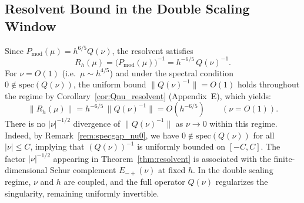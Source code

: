 \documentclass[12pt,a4paper]{amsart}
\theoremstyle{remark}
\begin{document}
\subsection{Resolvent Bound in the Double Scaling Window}
\label{subsec:resolvent_bound_ds}

Since $P_{\mathrm{mod}}(\mu) = h^{6/5}Q(\nu)$, the resolvent satisfies
\[
  R_h(\mu) = \bigl(P_{\mathrm{mod}}(\mu)\bigr)^{-1}
  = h^{-6/5}\,Q(\nu)^{-1}.
\]
For $\nu = O(1)$ (i.e.\ $\mu \sim h^{4/5}$) and under the spectral condition $0 \notin \mathrm{spec}(Q(\nu))$,
the uniform bound $\|Q(\nu)^{-1}\| = O(1)$ holds throughout the regime by
Corollary~\ref{cor:Qnu_resolvent} (Appendix~E), which yields:
\[
  \|R_h(\mu)\| = h^{-6/5}\,\|Q(\nu)^{-1}\| = O(h^{-6/5})
  \qquad (\nu = O(1)).
\]
There is no $|\nu|^{-1/2}$ divergence of $\|Q(\nu)^{-1}\|$ as $\nu \to 0$
within this regime. Indeed, by Remark~\ref{rem:specgap_nu0}, we have $0 \notin \mathrm{spec}(Q(\nu))$
for all $|\nu| \leq C$, implying that $(Q(\nu))^{-1}$ is uniformly bounded on $[-C,C]$.
The factor $|\nu|^{-1/2}$ appearing in Theorem~\ref{thm:resolvent} is
associated with the finite-dimensional Schur complement $E_{-+}(\nu)$ at fixed $h$.
In the double scaling regime, $\nu$ and $h$ are coupled, and the full operator
$Q(\nu)$ regularizes the singularity, remaining uniformly invertible.
\end{document}
